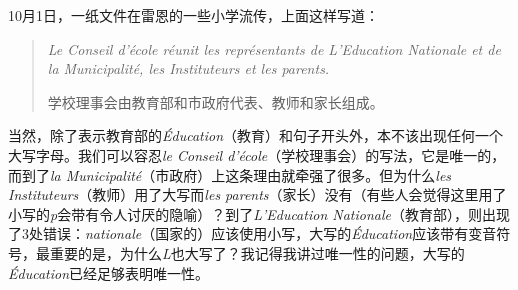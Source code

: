 10月1日，一纸文件在雷恩的一些小学流传，上面这样写道：

\begin{quote}
    \emph{Le Conseil d'école réunit les représentants de L'Education Nationale et de la Municipalité, les Instituteurs et les parents.}
    \begin{bil}
        学校理事会由教育部和市政府代表、教师和家长组成。
    \end{bil}
\end{quote}

当然，除了表示教育部的\emph{Éducation}（教育）和句子开头外，本不该出现任何一个大写字母。我们可以容忍\emph{le Conseil d'école}（学校理事会）的写法，它是唯一的，而到了\emph{la Municipalité}（市政府）上这条理由就牵强了很多。但为什么\emph{les Instituteurs}（教师）用了大写而\emph{les parents}（家长）没有（有些人会觉得这里用了小写的\emph{p}会带有令人讨厌的隐喻）？到了\emph{L'Education Nationale}（教育部），则出现了3处错误：\emph{nationale}（国家的）应该使用小写，大写的\emph{Éducation}应该带有变音符号，最重要的是，为什么\emph{L}也大写了？我记得我讲过唯一性的问题，大写的\emph{Éducation}已经足够表明唯一性。